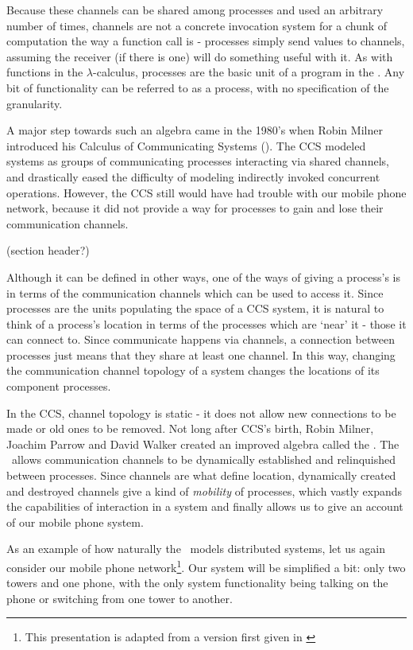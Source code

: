 Because these channels can be shared among processes and used an arbitrary number of times, channels are not a concrete invocation system for a chunk of computation the way a function call is - processes simply send values to channels, assuming the receiver (if there is one) will do something useful with it.  As with functions in the $\lambda$-calculus, processes are the basic unit of a program in the \picalc. Any bit of functionality can be referred to as a process, with no specification of the granularity.

A major step towards such an algebra came in the 1980's when Robin Milner introduced his Calculus of Communicating Systems (\!).   The CCS modeled systems as groups of communicating processes interacting via shared channels, and drastically eased the difficulty of modeling indirectly invoked concurrent operations.  However, the CCS still would have had trouble with our mobile phone network, because it did not provide a way for processes to gain and lose their communication channels.

(section header?)

	Although it can be defined in other ways, one of the ways of giving a process's\emph{} is in terms of the communication channels which can be used to access it.  Since processes are the units populating the space of a CCS system, it is natural to think of a process's location in terms of the processes which are `near' it - those it can connect to.  Since communicate happens via channels, a connection between processes just means that they share at least one channel.  In this way, changing the communication channel topology of a system changes the locations of its component processes.  
	
	In the CCS, channel topology is static - it does not allow new connections to be made or old ones to be removed.  Not long after CCS's birth, Robin Milner, Joachim Parrow and David Walker created an improved algebra called the \inidx{\picalc}.  The \picalc\ allows communication channels to be dynamically established and relinquished between processes.  Since channels are what define location, dynamically created and destroyed channels give a kind of \emph{mobility} of processes, which vastly expands the capabilities of interaction in a system and finally allows us to give an account of our mobile phone system.
	
	As an example of how naturally the \picalc\ models distributed systems, let us again consider our mobile phone network\footnote{This presentation is adapted from a version first given in \cite{miln99}}.  Our system will be simplified a bit: only two towers and one phone, with the only system functionality being talking on the phone or switching from one tower to another.
	
